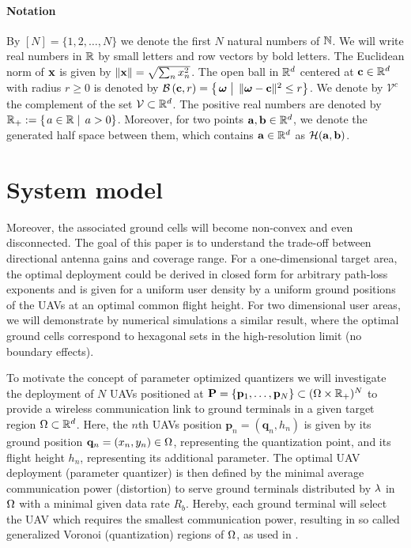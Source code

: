 \documentclass[smallabstract,smallcaptions]{dccpaper}
\newif\ifarxiv\arxivfalse
\renewcommand{\vq}{\mathbf p}
\renewcommand{\vp}{\mathbf q}
\renewcommand{\vQ}{\mathbf P}
\newcommand{\Ball}{\ensuremath{\mathcal B}}          %
\newcommand{\HS}{\ensuremath{\mathcal{H}}}          %
\newcommand{\Vor}{\ensuremath{\mathcal{V}}}         %
\newcommand{\philippstart}{\color{black}}
\newcommand{\philippend}{\color{black}}
\begin{document}
\philippstart \paragraph{Notation}  By $[N]=\{1,2,\dots,N\}$ we denote the first $N$ natural numbers of ${\mathbb N}$.  We will
write real numbers in ${\mathbb R}$ by small letters and row vectors by bold letters. The Euclidean norm of ${\mathbf x}$ is given by
$ \left\|{\mathbf x}\right\| =\sqrt{\sum_n x_n^2}$.  The open ball in ${\mathbb R}^d$ centered at ${\mathbf c}\in{\ensuremath{\mathbb R}}^d$ with radius $r\geq 0$ is denoted by
$\Ball\left(\vc,r\right)=\set{\vome}{\|\vome-\vc\|^2\le r}$.
We denote by $\Vor^c$ the complement of the set $\Vor\subset\R^d$. The positive real numbers are denoted by
$\R_+:=\set{a\in\R}{a>0}$.  Moreover, for two points ${\mathbf a},{\mathbf b}\in{\ensuremath{\mathbb R}}^d$, we denote the generated half space between them,
which contains ${\mathbf a}\in{\ensuremath{\mathbb R}}^d$ as $\HS(\va, \vb)$.  \philippend

\section{System model}\label{sec:model}
%
\philippstart
{}


Moreover, the associated ground cells will become non-convex and even
disconnected.  The goal of this paper is to understand the trade-off between directional antenna gains and coverage
range. For a one-dimensional target area, the optimal deployment could be derived in closed form for arbitrary path-loss
exponents and is given for a uniform user density by a uniform ground positions of the UAVs at an optimal common flight
height. For two dimensional user areas, we will demonstrate by numerical simulations a similar result, where the optimal
ground cells correspond to hexagonal sets in the high-resolution limit (no boundary effects). 
\philippend
\fi

To motivate the concept of parameter optimized quantizers we will investigate the deployment of $N$ UAVs positioned at
$\vQ=\{\vq_1,\dots,\vq_N\}\subset(\Ome\times\R_+)^N$ to provide a wireless communication link to ground terminals in a given
target region  $\Omega\subset{\ensuremath{\mathbb R}}^d$. Here, the $n$th UAVs position $\vq_n=(\vp_n,h_n)$ is given by its ground position
$\vp_n=(x_n,y_n)\in\Ome$, representing the quantization point, and its flight height $h_n$, representing its additional
parameter.  The optimal UAV deployment (parameter quantizer) is then defined by the minimal average communication
power (distortion) to serve ground terminals distributed by $\lambda$ in $\Omega$ with a minimal given data rate $R_b$. Hereby, each
ground terminal will select the UAV which requires the smallest communication power, resulting in  so called
generalized Voronoi (quantization) regions of $\Omega$,  as used in
\cite{Erdem16,GJ,GJcom18,GJ18,KJ17,ML,MLCS,KKSS18}.  
\ifarxiv
We also assume that the communication between all users and UAVs is
orthogonal, i.e., separated in frequency or time (slotted protocols).
\fi
\end{document}
